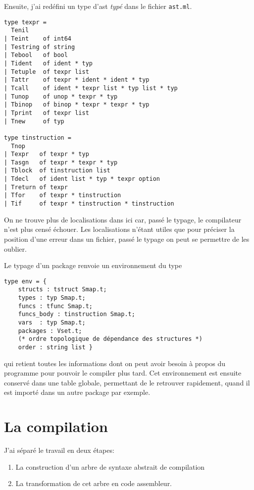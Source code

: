 \documentclass[11pt]{article}
\begin{document}
Ensuite, j'ai redéfini un type d'ast \textit{typé} dans le fichier \texttt{ast.ml}.

\begin{verbatim}
type texpr =
  Tenil
| Teint    of int64
| Testring of string
| Tebool   of bool
| Tident   of ident * typ
| Tetuple  of texpr list
| Tattr    of texpr * ident * ident * typ
| Tcall    of ident * texpr list * typ list * typ
| Tunop    of unop * texpr * typ
| Tbinop   of binop * texpr * texpr * typ
| Tprint   of texpr list
| Tnew     of typ

type tinstruction =
  Tnop
| Texpr   of texpr * typ
| Tasgn   of texpr * texpr * typ
| Tblock  of tinstruction list
| Tdecl   of ident list * typ * texpr option
| Treturn of texpr
| Tfor    of texpr * tinstruction
| Tif     of texpr * tinstruction * tinstruction
\end{verbatim}

On ne trouve plus de localisations dans ici car, passé le typage, le compilateur n'est plus censé échouer. Les localisations n'étant utiles que pour préciser la position d'une erreur dans un fichier, passé le typage on peut se permettre de les oublier.

Le typage d'un package renvoie un environnement du type

\begin{verbatim}
type env = {
    structs : tstruct Smap.t;
    types : typ Smap.t;
    funcs : tfunc Smap.t;
    funcs_body : tinstruction Smap.t;
    vars  : typ Smap.t;
    packages : Vset.t;
    (* ordre topologique de dépendance des structures *)
    order : string list }
\end{verbatim}

qui retient toutes les informations dont on peut avoir besoin à propos du programme pour pouvoir le compiler plus tard. Cet environnement est ensuite conservé dans une table globale, permettant de le retrouver rapidement, quand il est importé dans un autre package par exemple.

\section{La compilation}

J'ai séparé le travail en deux étapes:
\begin{enumerate}
\item La construction d'un arbre de syntaxe abstrait de compilation
\item La transformation de cet arbre en code assembleur.
\end{enumerate}
\end{document}
